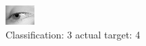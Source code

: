 \begin{figure}[h!]
\begin{center}
\includegraphics[width=0.60\columnwidth]{figures/ID3002_class_3_target_4.png}
\end{center}
\caption{ Classification: 3 actual target: 4}
\label{fig:ID3002_class_3_target_4}
\end{figure}
